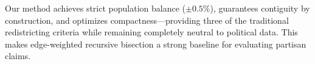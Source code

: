 Our method achieves strict population balance ($\pm 0.5\%$), guarantees contiguity by construction, and optimizes compactness—providing three of the traditional redistricting criteria while remaining completely neutral to political data. This makes edge-weighted recursive bisection a strong baseline for evaluating partisan claims.

